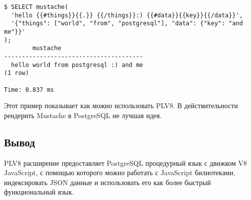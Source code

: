 \begin{lstlisting}[label=lst:plv8js16,caption=Рендер темплейтов]
$ SELECT mustache(
  'hello {{#things}}{{.}} {{/things}}:) {{#data}}{{key}}{{/data}}',
  '{"things": ["world", "from", "postgresql"], "data": {"key": "and me"}}'
);
		mustache                
---------------------------------------
  hello world from postgresql :) and me
(1 row)

Time: 0.837 ms
\end{lstlisting}

Этот пример показывает как можно использовать PLV8. В действительности рендерить Mustache в PostgreSQL не лучшая идея.

\subsection{Вывод}

PLV8 расширение предоставляет PostgreSQL процедурный язык с движком V8 JavaScript, с помощью которого можно работать с JavaScript билиотеками, индексировать JSON данные и использовать его как более быстрый функциональный язык.